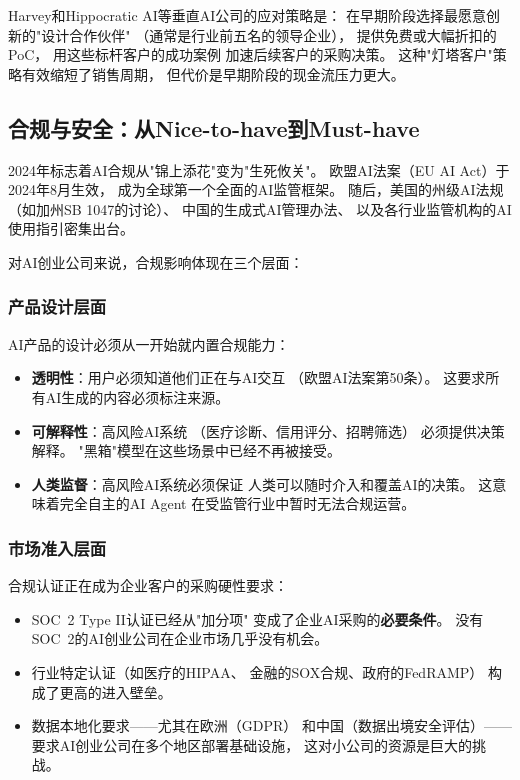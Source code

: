 Harvey和Hippocratic AI等垂直AI公司的应对策略是：
在早期阶段选择最愿意创新的"设计合作伙伴"
（通常是行业前五名的领导企业），
提供免费或大幅折扣的PoC，
用这些标杆客户的成功案例
加速后续客户的采购决策。
这种"灯塔客户"策略有效缩短了销售周期，
但代价是早期阶段的现金流压力更大。


\subsection{合规与安全：从Nice-to-have到Must-have}

2024年标志着AI合规从"锦上添花"变为"生死攸关"。
欧盟AI法案（EU AI Act）于2024年8月生效，
成为全球第一个全面的AI监管框架。
随后，美国的州级AI法规（如加州SB 1047的讨论）、
中国的生成式AI管理办法、
以及各行业监管机构的AI使用指引密集出台。

对AI创业公司来说，合规影响体现在三个层面：

\subsubsection{产品设计层面}
AI产品的设计必须从一开始就内置合规能力：
\begin{itemize}
  \item \textbf{透明性}：用户必须知道他们正在与AI交互
    （欧盟AI法案第50条）。
    这要求所有AI生成的内容必须标注来源。
  \item \textbf{可解释性}：高风险AI系统
    （医疗诊断、信用评分、招聘筛选）
    必须提供决策解释。
    "黑箱"模型在这些场景中已经不再被接受。
  \item \textbf{人类监督}：高风险AI系统必须保证
    人类可以随时介入和覆盖AI的决策。
    这意味着完全自主的AI Agent
    在受监管行业中暂时无法合规运营。
\end{itemize}

\subsubsection{市场准入层面}
合规认证正在成为企业客户的采购硬性要求：
\begin{itemize}
  \item SOC~2 Type II认证已经从"加分项"
    变成了企业AI采购的\textbf{必要条件}。
    没有SOC~2的AI创业公司在企业市场几乎没有机会。
  \item 行业特定认证（如医疗的HIPAA、
    金融的SOX合规、政府的FedRAMP）
    构成了更高的进入壁垒。
  \item 数据本地化要求——尤其在欧洲（GDPR）
    和中国（数据出境安全评估）——
    要求AI创业公司在多个地区部署基础设施，
    这对小公司的资源是巨大的挑战。
\end{itemize}

